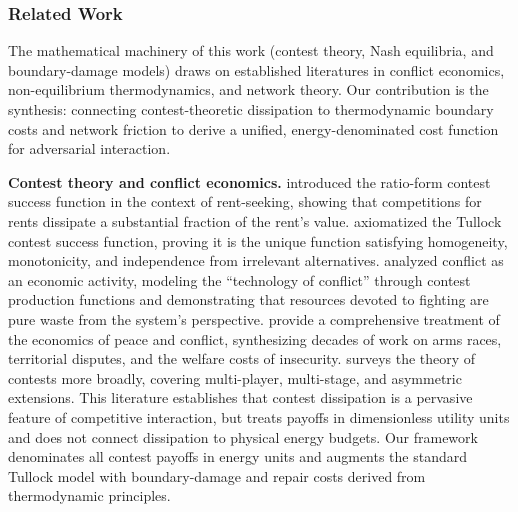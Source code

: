 \documentclass[11pt]{article}
\theoremstyle{plain}
\theoremstyle{definition}
\theoremstyle{remark}
\let\origsubsubsection\subsubsection
\renewcommand{\subsubsection}{\needspace{4\baselineskip}\origsubsubsection}
\begin{document}
\subsubsection{Related Work}\label{related-work-4}

The mathematical machinery of this work (contest theory, Nash
equilibria, and boundary-damage models) draws on established literatures
in conflict economics, non-equilibrium thermodynamics, and network
theory. Our contribution is the synthesis: connecting contest-theoretic
dissipation to thermodynamic boundary costs and network friction to
derive a unified, energy-denominated cost function for adversarial
interaction.

\textbf{Contest theory and conflict economics.} \citet{Tullock1980}
introduced the ratio-form contest success function in the context of
rent-seeking, showing that competitions for rents dissipate a
substantial fraction of the rent's value. \citet{Skaperdas1996}
axiomatized the Tullock contest success function, proving it is the
unique function satisfying homogeneity, monotonicity, and independence
from irrelevant alternatives. \citet{Hirshleifer1991} analyzed conflict
as an economic activity, modeling the ``technology of conflict'' through
contest production functions and demonstrating that resources devoted to
fighting are pure waste from the system's perspective.
\citet{GarfinkelSkaperdas2012} provide a comprehensive treatment of the
economics of peace and conflict, synthesizing decades of work on arms
races, territorial disputes, and the welfare costs of insecurity.
\citet{Konrad2009} surveys the theory of contests more broadly, covering
multi-player, multi-stage, and asymmetric extensions. This literature
establishes that contest dissipation is a pervasive feature of
competitive interaction, but treats payoffs in dimensionless utility
units and does not connect dissipation to physical energy budgets. Our
framework denominates all contest payoffs in energy units and augments
the standard Tullock model with boundary-damage and repair costs derived
from thermodynamic principles.
\end{document}
